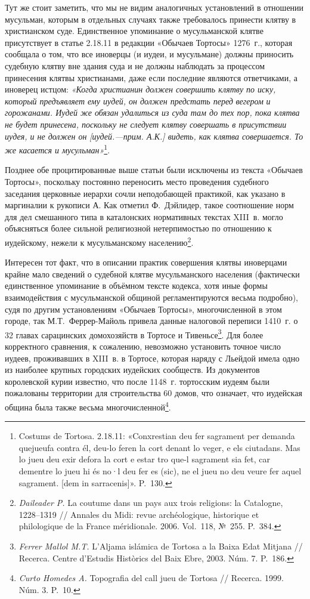 Тут же стоит заметить, что мы не видим аналогичных установлений в отношении мусульман, которым в отдельных случаях также требовалось принести клятву в христианском суде. Единственное упоминание о мусульманской клятве присутствует в статье 2.18.11 в редакции «Обычаев Тортосы» 1276~г., которая сообщала о том, что все иноверцы (и иудеи, и мусульмане) должны приносить судебную клятву вне здания суда и не должны наблюдать за процессом принесения клятвы христианами, даже если последние являются ответчиками, а иноверец истцом: \emph{«Когда христианин должен совершить клятву по иску, который предъявляет ему иудей, он должен предстать перед }\emph{вегером}\emph{ и горожанами. Иудей же обязан удалиться из суда там до тех пор, пока клятва не будет принесена, поскольку не следует клятву совершать в присутствии иудея, и не должен он }\emph{[иудей.---прим. А.К.] видеть, как клятва совершается. То же касается и мусульман»}\footnote{Costums de Tortosa. 2.18.11: «Conxrestian deu fer sagrament per demanda quejueufa contra él, deu-lo feren la cort denant lo veger, e els ciutadans. Mas lo jueu deu exir defora la cort e estar tro que-l sagrament sia fet, car dementre lo jueu hi és no·l deu fer es (sic), ne el jueu no deu veure fer aquel sagrament. [dem in sarracenis]». P.~130.}.

Позднее обе процитированные выше статьи были исключены из текста «Обычаев Тортосы», поскольку постоянно переносить место проведения судебного заседания церковные иерархи сочли неподобающей практикой, как указано в маргиналии к рукописи А. Как отметил Ф.~Дэйлидер, такое соотношение норм для дел смешанного типа в каталонских нормативных текстах XIII~в. могло объясняться более сильной религиозной нетерпимостью по отношению к иудейскому, нежели к мусульманскому населению\footnote{\emph{Daileader P. }La coutume dans un pays aux trois religions: la Catalogne, 1228--1319 // Annales du Midi: revue archéologique, historique et philologique de la France méridionale. 2006. Vol.~118, №~255. P.~384.}.

Интересен тот факт, что в описании практик совершения клятвы иноверцами крайне мало сведений о судебной клятве мусульманского населения (фактически единственное упоминание в объёмном тексте кодекса, хотя иные формы взаимодействия с мусульманской общиной регламентируются весьма подробно), судя по другим установлениям «Обычаев Тортосы», многочисленной в этом городе, так М.Т.~Феррер-Майоль привела данные налоговой переписи 1410~г. о 32 главах сарацинских домохозяйств в Тортосе и Тивеньсе\footnote{\emph{Ferrer Mallol M.T. }L'Aljama islámica de Tortosa a la Baixa Edat Mitjana // Recerca. Centre d'Estudis Històrics del Baix Ebre, 2003. Núm. 7. P.~186.}. Для более корректного сравнения, к сожалению, невозможно установить точное число иудеев, проживавших в XIII~в. в Тортосе, которая наряду с Льейдой имела одно из наиболее крупных городских иудейских сообществ. Из документов королевской курии известно, что после 1148~г. тортосским иудеям были пожалованы территории для строительства 60 домов, что означает, что иудейская община была также весьма многочисленной\footnote{\emph{Curto Homedes A. }Topografia del call jueu de Tortosa // Recerca. 1999. Núm. 3. P.~10.}.

